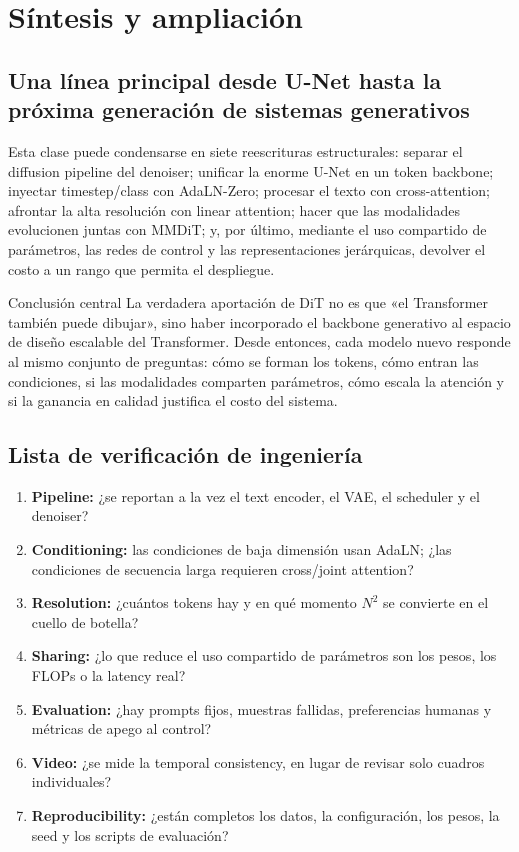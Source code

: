 \section{Síntesis y ampliación}

\subsection{Una línea principal desde U-Net hasta la próxima generación de sistemas generativos}

Esta clase puede condensarse en siete reescrituras estructurales: separar el diffusion pipeline del denoiser; unificar la enorme U-Net en un token backbone; inyectar timestep/class con AdaLN-Zero; procesar el texto con cross-attention; afrontar la alta resolución con linear attention; hacer que las modalidades evolucionen juntas con MMDiT; y, por último, mediante el uso compartido de parámetros, las redes de control y las representaciones jerárquicas, devolver el costo a un rango que permita el despliegue.

\begin{importantbox}{Conclusión central}
La verdadera aportación de DiT no es que «el Transformer también puede dibujar», sino haber incorporado el backbone generativo al espacio de diseño escalable del Transformer. Desde entonces, cada modelo nuevo responde al mismo conjunto de preguntas: cómo se forman los tokens, cómo entran las condiciones, si las modalidades comparten parámetros, cómo escala la atención y si la ganancia en calidad justifica el costo del sistema.
\end{importantbox}

\subsection{Lista de verificación de ingeniería}

\begin{enumerate}
  \item \textbf{Pipeline: }¿se reportan a la vez el text encoder, el VAE, el scheduler y el denoiser?
  \item \textbf{Conditioning: }las condiciones de baja dimensión usan AdaLN; ¿las condiciones de secuencia larga requieren cross/joint attention?
  \item \textbf{Resolution: }¿cuántos tokens hay y en qué momento $N^2$ se convierte en el cuello de botella?
  \item \textbf{Sharing: }¿lo que reduce el uso compartido de parámetros son los pesos, los FLOPs o la latency real?
  \item \textbf{Evaluation: }¿hay prompts fijos, muestras fallidas, preferencias humanas y métricas de apego al control?
  \item \textbf{Video: }¿se mide la temporal consistency, en lugar de revisar solo cuadros individuales?
  \item \textbf{Reproducibility: }¿están completos los datos, la configuración, los pesos, la seed y los scripts de evaluación?
\end{enumerate}

